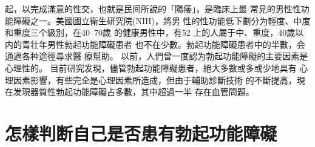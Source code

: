 \documentclass[12pt,UTF8]{ctexbook}
\begin{document}
起，以完成滿意的性交，也就是民间所說的「陽痿」，是臨床上最
常見的男性性功能障礙之一。美國國立衛生研究院(NIH)，將男
性的性功能低下劃分为輕度、中度和重度三个級別，在40~70歲
的健康男性中，有52%
上的人屬于中、重度，40歲以内的青壮年男性勃起功能障礙患者
也不在少數。勃起功能障礙患者中的半數，会通過各种途徑尋求醫
療幫助。
以前，人們曾一度認为勃起功能障礙的主要因素是心理性的。
目前研究发現，儘管勃起功能障礙患者，絕大多數或多或少地具有
心理因素影響，有些完全是心理因素所造成，但由于輔助診斷技術
的不斷提高，現在发現器質性勃起功能障礙占多數，其中超過一半
存在血管問題。

\section{怎樣判断自己是否患有勃起功能障礙}
\end{document}
